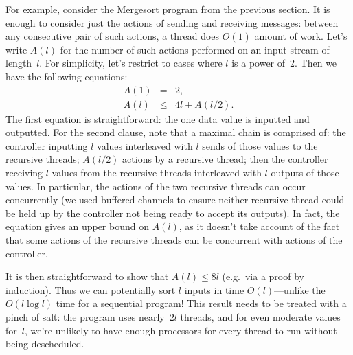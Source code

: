 For example, consider the Mergesort program from the previous section.  It is
enough to consider just the actions of sending and receiving messages: between
any consecutive pair of such actions, a thread does $O(1)$ amount of work.
Let's write $A(l)$ for the number of such actions performed on an input stream
of length~$l$.  For simplicity, let's restrict to  cases where $l$ is a
power of~2.  Then we have the following equations:
%
\begin{eqnarray*}
A(1) & = & 2, \\
A(l) & \le & 4l+A(l/2).
\end{eqnarray*}
%
The first equation is straightforward: the one data value is inputted and
outputted.  For the second clause, note that a maximal chain is comprised of:
the controller inputting $l$ values interleaved with $l$ sends of those values
to the recursive threads; $A(l/2)$ actions by a recursive thread; then the
controller receiving $l$ values from the recursive threads interleaved with
$l$ outputs of those values.  In particular, the actions of the two recursive
threads can occur concurrently (we used buffered channels to ensure neither
recursive thread could be held up by the controller not being ready to accept
its outputs).  In fact, the equation gives an upper bound on $A(l)$, as it
doesn't take account of the fact that some actions of the recursive threads
can be concurrent with actions of the controller. 

It is then straightforward to show that $A(l) \le 8l$ (e.g.~via a proof by
induction).  Thus we can potentially sort $l$ inputs in time $O(l)$---unlike
the $O(l \log l)$ time for a sequential program!  This result needs to be
treated with a pinch of salt: the program uses nearly~$2l$ threads, and for
even moderate values for~$l$, we're unlikely to have enough processors for
every thread to run without being descheduled.
